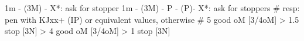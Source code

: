 1m - (3M) - X*: ask for stopper
1m - (3M) - P - (P)- X*: ask for stoppers
# resp: pen with KJxx+ (IP) or equivalent values, otherwise
# 5 good oM [3/4oM] > 1.5 stop [3N] > 4 good oM [3/4oM] > 1 stop [3N]
